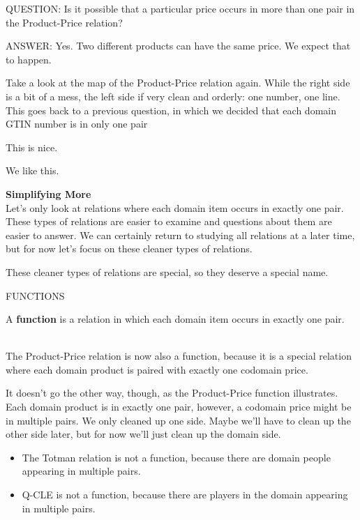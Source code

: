 \documentclass{ximera}
\begin{document}
\begin{dialogue}
\item[QUESTION:] Is it possible that a particular price occurs in more than one pair in the Product-Price relation? \\
\item[ANSWER:] Yes. Two different products can have the same price.  We expect that to happen. \\
\end{dialogue}


Take a look at the map of the Product-Price relation again.  While the right side is a bit of a mess, the left side if very clean and orderly: one number, one line.  This goes back to a previous question, in which we decided that each domain GTIN number is in only one pair



This is nice. 


We like this.

\textbf{Simplifying More} \\
Let's only look at relations where each domain item occurs in exactly one pair. These types of relations are easier to examine and questions about them are easier to answer.  We can certainly return to studying all relations at a later time, but for now let's focus on these cleaner types of relations.  

These cleaner types of relations are special, so they deserve a special name.


\begin{center}
FUNCTIONS
\end{center}

\begin{definition}
A \textbf{function} is a relation in which each domain item occurs in exactly one pair.
\end{definition}

\quad \\

The Product-Price relation is now also a function, because it is a special relation where each domain product is paired with exactly one codomain price.

It doesn't go the other way, though, as the Product-Price function illustrates. Each domain product is in exactly one pair, however, a codomain price might be in multiple pairs.  We only cleaned up one side.  Maybe we'll have to clean up the other side later, but for now we'll just clean up the domain side.

\begin{itemize}
\item The Totman relation is not a function, because there are domain people appearing in multiple pairs.
\item Q-CLE is not a function, because there are players in the domain appearing in multiple pairs.
\end{itemize}
\end{document}
